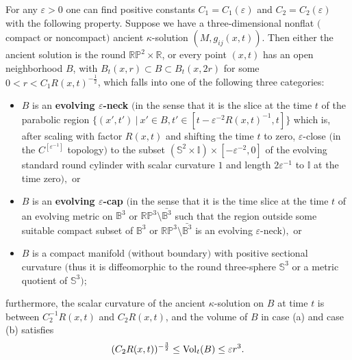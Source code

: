 \begin{theorem}
  \label{thm:cz-ancient-kappa-canonical-neighborhoods}
 For any $\varepsilon>0$ one can find
positive constants $C_1=C_1(\varepsilon)$ and
$C_2=C_2(\varepsilon)$ with the following property. Suppose we
have a three-dimensional nonflat $($compact or noncompact$)$
ancient $\kappa$-solution $(M,g_{ij}(x,t))$. Then either the
ancient solution is the round $\mathbb{R}\mathbb{P}^2 \times
\mathbb{R}$, or every point $(x,t)$ has an open neighborhood $B$,
with $B_t(x,r)\subset B \subset B_t(x,2r)$ for some
$0<r<C_1R(x,t)^{-\frac{1}{2}}$, which falls into one of the
following three categories:
\begin{itemize}
\item[(a)] $B$ is an {\bf evolving $\varepsilon$-neck} $($in the
sense that it is the slice at the time $t$ of the parabolic region
$\{(x',t')\ |\ x' \in B, t' \in [t - \varepsilon^{-2}R(x,t)^{-1},
t] \}$ which is, after scaling with factor $R(x,t)$ and shifting
the time $t$ to zero, $\varepsilon$-close $($in the
$C^{[\varepsilon^{-1}]}$ topology$)$ to the subset
$(\mathbb{S}^2\times \mathbb{I})\times [-\varepsilon^{-2},0]$ of
the evolving standard round cylinder with scalar curvature $1$ and
length $2\varepsilon^{-1}$ to $\mathbb{I}$ at the time zero$),$ or
 \item[(b)] $B$ is an {\bf
evolving $\varepsilon$-cap} $($in the sense that it is the time
slice at the time $t$ of an evolving metric on $\mathbb{B}^3$ or
$\mathbb{R}\mathbb{P}^3\setminus\bar{\mathbb{B}^3}$ such that the
region outside some suitable compact subset of $\mathbb{B}^3$ or
$\mathbb{R}\mathbb{P}^3\setminus\bar{\mathbb{B}^3}$ is an evolving
$\varepsilon$-neck$),$ or 
\item[(c)] $B$ is a compact manifold $($without boundary$)$ with
positive sectional curvature $($thus it is diffeomorphic to the
round three-sphere $\mathbb{S}^3$ or a metric quotient of
$\mathbb{S}^3);$
\end{itemize}
furthermore, the scalar curvature of the ancient $\kappa$-solution
on $B$ at time $t$ is between $C_2^{-1}R(x,t)$ and $C_2R(x,t)$,
and the volume of $B$ in case {\rm (a)} and case {\rm (b)}
satisfies
$$
(C_2R(x,t))^{-\frac{3}{2}} \leq \operatorname{Vol}_t(B) \leq \varepsilon r^3.
$$
\end{theorem}

